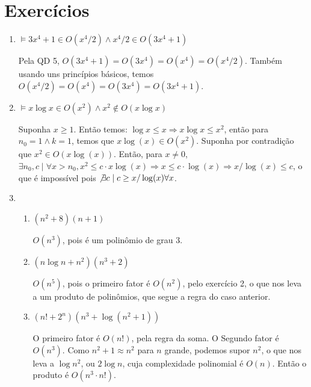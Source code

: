 \documentclass{article}
\begin{document}
\section*{Exercícios}

\begin{enumerate}

	\item \( \models 3x^4 + 1 \in O(x^4/2) \land x^4/2 \in O(3x^4+1)\)

	      Pela QD 5, \( O(3x^4 + 1 ) = O(3x^4) = O(x^4) = O(x^4/2)\). Também usando uns princípios básicos, temos \( O(x^4/2) = O(x^4) = O(3x^4) = O(3x^4 +1) \).

	\item \( \models x \log x \in O(x^2) \land x^2 \not \in O(x \log x) \)

	      Suponha \( x \geq 1 \). Então temos: \( \log x \leq x \Rightarrow x \log x \leq x^2\), então para \( n_0 = 1 \land k = 1 \), temos que \( x \log (x) \in O(x^2) \). Suponha por contradição que \( x^2 \in O(x\log (x)) \). Então, para \( x \neq 0 \), \( \exists n_0, c \mid \forall x > n_0, x^2 \leq c \cdot x\log (x) \Rightarrow x \leq c \cdot \log (x) \Rightarrow x/\log (x) \leq c\), o que é impossível pois \( \not \exists c \mid c \geq x/\log (x) \forall x \).

	\item

	      \begin{enumerate}

		      \item \( (n^2 + 8)(n+1) \)

		            \( O(n^3) \), pois é um polinômio de grau 3.

		      \item \( (n \log n + n^2)(n^3 + 2) \)

		            \( O(n^5) \), pois o primeiro fator é \( O(n^2) \), pelo exercício 2, o que nos leva a um produto de polinômios, que segue a regra do caso anterior.

		      \item \( (n! + 2^n ) (n^3 + \log( n^2 + 1 )) \)

		            O primeiro fator é \( O(n!) \), pela regra da soma. O Segundo fator é \( O(n^3) \). Como \( n^2 + 1 \approx n^2 \) para \( n \) grande, podemos supor \( n^2 \), o que nos leva a \( \log n^2 \), ou \( 2\log n \), cuja complexidade polinomial é \( O(n) \). Então o produto é \( O(n^3 \cdot n!) \).

	      \end{enumerate}


\end{enumerate}
\end{document}
